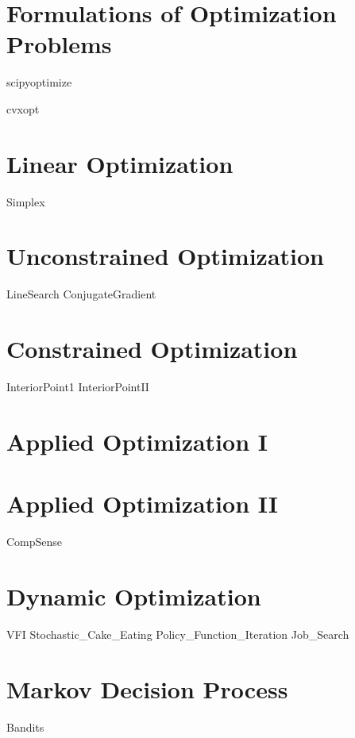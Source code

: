 \documentclass[nociteref]{SIAM-GH-book}
\begin{document}
\part{Formulations of Optimization Problems}
{scipyoptimize}

{cvxopt}

\part{Linear Optimization}
{Simplex}


\part{Unconstrained Optimization}
{LineSearch}
{ConjugateGradient}

\part{Constrained Optimization}
{InteriorPoint1}
{InteriorPointII}

\part{Applied Optimization I}

\part{Applied Optimization II}
{CompSense}

\part{Dynamic Optimization}
{VFI}
{Stochastic_Cake_Eating}
{Policy_Function_Iteration}
{Job_Search}

\part{Markov Decision Process}
{Bandits}
\end{document}
